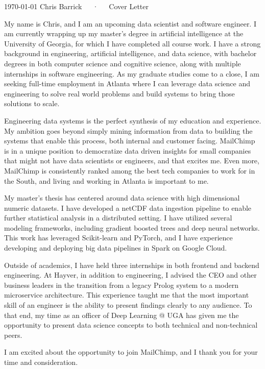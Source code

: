 \documentclass[11pt, letterpaper]{awesome-cv}
\begin{document}
\makecvheader[C]

\makecvfooter
  {\today}
  {Chris Barrick~~~·~~~Cover Letter}
  {\thepage}

\makelettertitle

\begin{cvletter}

My name is Chris, and I am an upcoming data scientist and software engineer. I am currently wrapping up my master's degree in artificial intelligence at the University of Georgia, for which I have completed all course work. I have a strong background in engineering, artificial intelligence, and data science, with bachelor degrees in both computer science and cognitive science, along with multiple internships in software engineering. As my graduate studies come to a close, I am seeking full-time employment in Atlanta where I can leverage data science and engineering to solve real world problems and build systems to bring those solutions to scale.

Engineering data systems is the perfect synthesis of my education and experience. My ambition goes beyond simply mining information from data to building the systems that enable this process, both internal and customer facing. MailChimp is in a unique position to democratize data driven insights for small companies that might not have data scientists or engineers, and that excites me. Even more, MailChimp is consistently ranked among the best tech companies to work for in the South, and living and working in Atlanta is important to me.

My master's thesis has centered around data science with high dimensional numeric datasets. I have developed a netCDF data ingestion pipeline to enable further statistical analysis in a distributed setting. I have utilized several modeling frameworks, including gradient boosted trees and deep neural networks. This work has leveraged Scikit-learn and PyTorch, and I have experience developing and deploying big data pipelines in Spark on Google Cloud.

Outside of academics, I have held three internships in both frontend and backend engineering. At Hayver, in addition to engineering, I advised the CEO and other business leaders in the transition from a legacy Prolog system to a modern microservice architecture. This experience taught me that the most important skill of an engineer is the ability to present findings clearly to any audience. To that end, my time as an officer of Deep Learning @ UGA has given me the opportunity to present data science concepts to both technical and non-technical peers.

I am excited about the opportunity to join MailChimp, and I thank you for your time and consideration.


\end{cvletter}


\makeletterclosing
\end{document}
